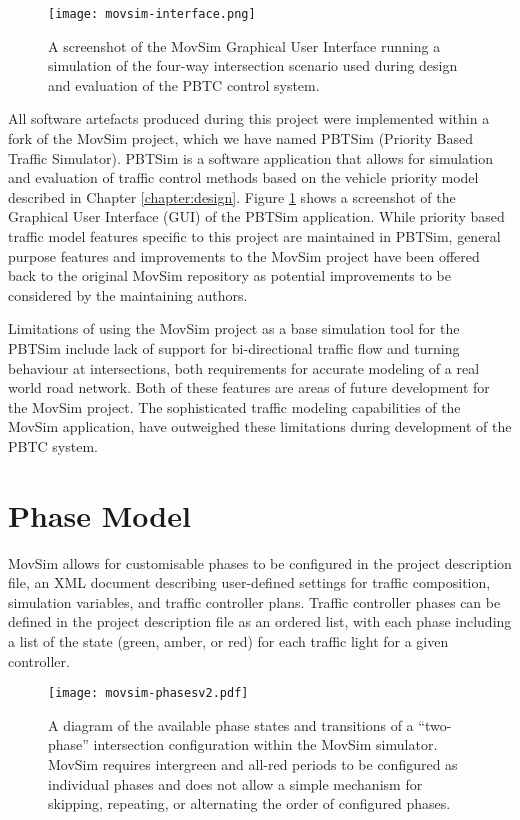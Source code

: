 \begin{figure}[]
\centering
	\texttt{[image: movsim-interface.png]}
	\caption{ A screenshot of the MovSim Graphical User Interface running a simulation of the four-way intersection scenario used during design and evaluation of the PBTC control system. }
\label{pbtsim-interface}
\end{figure}

All software artefacts produced during this project were implemented within a fork of the MovSim project, which we have named PBTSim (Priority Based Traffic Simulator). PBTSim is a software application that allows for simulation and evaluation of traffic control methods based on the vehicle priority model described in Chapter \ref{chapter:design}. Figure \ref{pbtsim-interface} shows a screenshot of the Graphical User Interface (GUI) of the PBTSim application. While priority based traffic model features specific to this project are maintained in PBTSim, general purpose features and improvements to the MovSim project have been offered back to the original MovSim repository as potential improvements to be considered by the maintaining authors. 

Limitations of using the MovSim project as a base simulation tool for the PBTSim include lack of support for bi-directional traffic flow and turning behaviour at intersections, both requirements for accurate modeling of a real world road network. Both of these features are areas of future development for the MovSim project. The sophisticated traffic modeling capabilities of the MovSim application, have outweighed these limitations during development of the PBTC system.

\section{Phase Model}

MovSim allows for customisable phases to be configured in the project description file, an XML document describing user-defined settings for traffic composition, simulation variables, and traffic controller plans. Traffic controller phases can be defined in the project description file as an ordered list, with each phase including a list of the state (green, amber, or red) for each traffic light for a given controller. 

\begin{figure}[]
\centering
	\texttt{[image: movsim-phasesv2.pdf]}
	\caption{ A diagram of the available phase states and transitions of a ``two-phase'' intersection configuration within the MovSim simulator. MovSim requires intergreen and all-red periods to be configured as individual phases and does not allow a simple mechanism for skipping, repeating, or alternating the order of configured phases. }
\label{movsimphasediagram}
\end{figure}

